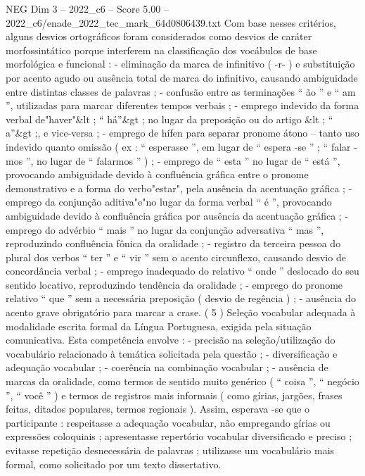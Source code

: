 \begin{textsample}{NEG Dim 3 – 2022\_c6 – Score 5.00 – 2022\_c6/enade\_2022\_tec\_mark\_64d0806439.txt}
Com base nesses critérios, alguns desvios ortográficos foram considerados como desvios de caráter morfossintático porque interferem na classificação dos vocábulos de base morfológica e funcional : - eliminação da marca de infinitivo ( -r- ) e substituição por acento agudo ou ausência total de marca do infinitivo, causando ambiguidade entre distintas classes de palavras ; - confusão entre as terminações “ ão ” e “ am ”, utilizadas para marcar diferentes tempos verbais ; - emprego indevido da forma verbal de"haver"\&lt ; “ há”\&gt ; no lugar da preposição ou do artigo \&lt ; “ a”\&gt ;, e vice-versa ; - emprego de hífen para separar pronome átono – tanto uso indevido quanto omissão ( ex : “ esperasse ”, em lugar de “ espera -se ” ; “ falar -mos ”, no lugar de “ falarmos ” ) ; - emprego de “ esta ” no lugar de “ está ”, provocando ambiguidade devido à confluência gráfica entre o pronome demonstrativo e a forma do verbo"estar", pela ausência da acentuação gráfica ; - emprego da conjunção aditiva"e"no lugar da forma verbal “ é ”, provocando ambiguidade devido à confluência gráfica por ausência da acentuação gráfica ; - emprego do advérbio “ mais ” no lugar da conjunção adversativa “ mas ”, reproduzindo confluência fônica da oralidade ; - registro da terceira pessoa do plural dos verbos “ ter ” e “ vir ” sem o acento circunflexo, causando desvio de concordância verbal ; - emprego inadequado do relativo “ onde ” deslocado do seu sentido locativo, reproduzindo tendência da oralidade ; - emprego do pronome relativo “ que ” sem a necessária preposição ( desvio de regência ) ; - ausência do acento grave obrigatório para marcar a crase. ( 5 ) Seleção vocabular adequada à modalidade escrita formal da Língua Portuguesa, exigida pela situação comunicativa.
Esta competência envolve : - precisão na seleção/utilização do vocabulário relacionado à temática solicitada pela questão ; - diversificação e adequação vocabular ; - coerência na combinação vocabular ; - ausência de marcas da oralidade, como termos de sentido muito genérico ( “ coisa ”, “ negócio ”, “ você ” ) e termos de registros mais informais ( como gírias, jargões, frases feitas, ditados populares, termos regionais ).
Assim, esperava -se que o participante : respeitasse a adequação vocabular, não empregando gírias ou expressões coloquiais ; apresentasse repertório vocabular diversificado e preciso ; evitasse repetição desnecessária de palavras ; utilizasse um vocabulário mais formal, como solicitado por um texto dissertativo.

\end{textsample}
